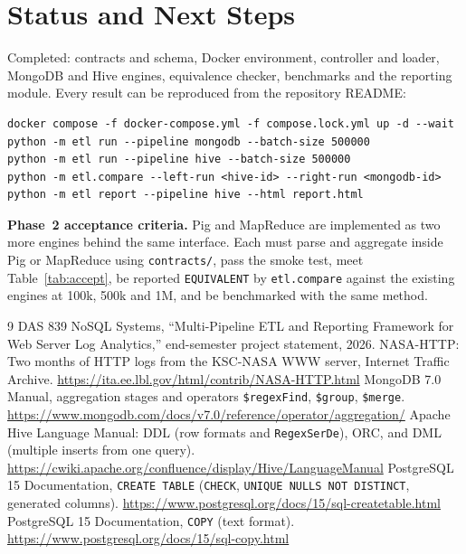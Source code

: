 \documentclass[conference]{IEEEtran}
\newcommand{\code}[1]{\texttt{\small #1}}
\begin{document}
\section{Status and Next Steps}
Completed: contracts and schema, Docker environment, controller and loader, MongoDB and Hive
engines, equivalence checker, benchmarks and the reporting module. Every result can be
reproduced from the repository README:

\begin{lstlisting}
docker compose -f docker-compose.yml -f compose.lock.yml up -d --wait
python -m etl run --pipeline mongodb --batch-size 500000
python -m etl run --pipeline hive --batch-size 500000
python -m etl.compare --left-run <hive-id> --right-run <mongodb-id>
python -m etl report --pipeline hive --html report.html
\end{lstlisting}

\textbf{Phase~2 acceptance criteria.} Pig and MapReduce are implemented as two more engines
behind the same interface. Each must parse and aggregate inside Pig or MapReduce using
\code{contracts/}, pass the smoke test, meet Table~\ref{tab:accept}, be reported
\code{EQUIVALENT} by \code{etl.compare} against the existing engines at 100k, 500k and 1M,
and be benchmarked with the same method.

\begin{thebibliography}{9}
 DAS 839 NoSQL Systems, ``Multi-Pipeline ETL and Reporting Framework for Web
Server Log Analytics,'' end-semester project statement, 2026.
 NASA-HTTP: Two months of HTTP logs from the KSC-NASA WWW server, Internet
Traffic Archive. \url{https://ita.ee.lbl.gov/html/contrib/NASA-HTTP.html}
 MongoDB 7.0 Manual, aggregation stages and operators \texttt{\$regexFind},
\texttt{\$group}, \texttt{\$merge}.
\url{https://www.mongodb.com/docs/v7.0/reference/operator/aggregation/}
 Apache Hive Language Manual: DDL (row formats and \texttt{RegexSerDe}), ORC,
and DML (multiple inserts from one query).
\url{https://cwiki.apache.org/confluence/display/Hive/LanguageManual}
 PostgreSQL 15 Documentation, \texttt{CREATE TABLE} (\texttt{CHECK},
\texttt{UNIQUE NULLS NOT DISTINCT}, generated columns).
\url{https://www.postgresql.org/docs/15/sql-createtable.html}
 PostgreSQL 15 Documentation, \texttt{COPY} (text format).
\url{https://www.postgresql.org/docs/15/sql-copy.html}
\end{thebibliography}
\end{document}
